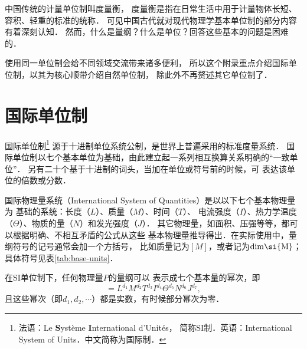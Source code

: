 中国传统的计量单位制叫度量衡，
度量衡是指在日常生活中用于计量物体长短、容积、轻重的标准的统称．
可见中国古代就对现代物理学基本单位制的部分内容有着深刻认知．
然而，什么是量纲？什么是单位？回答这些基本的问题是困难的．

使用同一单位制会给不同领域交流带来诸多便利，
所以这个附录重点介绍国际单位制，以其为核心顺带介绍自然单位制，
除此外不再赘述其它单位制了．

\section{国际单位制}
国际单位制{\footnote{法语：Le {\bf S}ystème {\bf I}nternational d'Unités，
        简称SI制．英语：International System of Units．中文简称为国际制．}}
源于十进制单位系统{\kaishu 公制}，是世界上普遍采用的标准度量系统． 
国际单位制以七个基本单位为基础，由此建立起一系列相互换算关系明确的“一致单位”．
另有二十个基于十进制的词头，当加在单位或符号前的时候，可
表达该单位的倍数或分数．


国际物理量系统（International System of Quantities）是以以下七个基本物理量为
基础的系统：长度（$\si{L}$）、质量（$\si{M}$）、时间（$\si{T}$）、
电流强度（$\si{I}$）、热力学温度（$\Theta$）、物质的量（$\si{N}$）和发光强度（$\si{J}$）．
其它物理量，如面积、压强等等，都可以根据明确、不相互矛盾的公式从这些
基本物理量推导得出．在实际使用中，量纲符号的记号通常会加一个方括号，
比如质量记为$[\si{M}]$，或者记为$\rm{dim} \si{M}$；具体符号见表\ref{tab:base-units}．


在SI单位制下，任何物理量$P$的量纲可以
表示成七个基本量的幂次，即
\begin{equation} %
    [P]=\si{L}^{d_1} \si{M}^{d_2} \si{T}^{d_3} \si{I}^{d_4} \Theta^{d_5} \si{N}^{d_6} \si{J}^{d_7} ,
\end{equation}
且这些幂次（即$d_1,d_2,\cdots$）都是实数，有时候部分幂次为零．